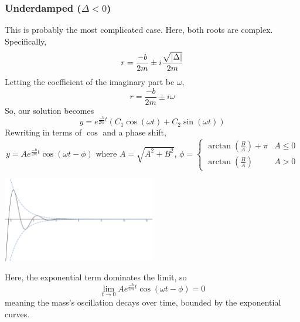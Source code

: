\subsubsection{Underdamped ($\Delta < 0$)}
This is probably the most complicated case. Here, both roots are complex. Specifically,
\begin{equation*}
	r = \frac{-b}{2m} \pm i\frac{\sqrt{\lvert \Delta \rvert}}{2m}
\end{equation*}
Letting the coefficient of the imaginary part be $\omega$,
\begin{equation*}
	r = \frac{-b}{2m} \pm i\omega
\end{equation*}
So, our solution becomes
\begin{equation*}
	y = e^{\frac{-b}{2m} t}\left(C_1\cos{(\omega t)} + C_2\sin{(\omega t)}\right)
\end{equation*}
Rewriting in terms of $\cos$ and a phase shift,
\begin{equation*}
	y = Ae^{\frac{-b}{2m} t}\cos{(\omega t - \phi)} \text{ where }
	A = \sqrt{A^2 + B^2} \text{, } \phi = \begin{cases}
		\arctan{\left(\frac{B}{A}\right)} + \pi & A \leq 0 \\
		\arctan{\left(\frac{B}{A}\right)} & A > 0
	\end{cases}
\end{equation*}
\begin{center}
	\includegraphics[width=0.5\textwidth]{./higherOrder/freeVibrs/underdamped.png}
\end{center}
Here, the exponential term dominates the limit, so
\begin{equation*}
	\lim\limits_{t \to 0}{Ae^{\frac{-b}{2m}t}\cos{(\omega t - \phi)}} = 0
\end{equation*}
meaning the mass's oscillation decays over time, bounded by the exponential curves. 